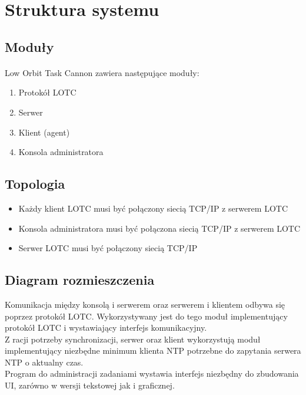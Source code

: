 \documentclass[10pt,a4paper]{article}
\begin{document}
	\section{Struktura systemu}
	
	    \subsection{Moduły}	
	        \paragraph{}
		    Low Orbit Task Cannon zawiera następujące moduły:
		
			\begin{enumerate}
		        \item Protokół LOTC
		        \item Serwer
		        \item Klient (agent)
		        \item Konsola administratora
		    \end{enumerate}
		    
	    \subsection{Topologia}
	    
		    \begin{itemize}
		        \item Każdy klient LOTC musi być połączony siecią TCP/IP z serwerem LOTC
		        \item Konsola administratora musi być połączona siecią TCP/IP z serwerem LOTC 
		        \item Serwer LOTC musi być połączony siecią TCP/IP
		    \end{itemize}
		    
		    \begin{figure}[H]
				\def\svgwidth{\columnwidth}
				
			\end{figure}
			
        \pagebreak			
			
	    \subsection{Diagram rozmieszczenia}
		    Komunikacja między konsolą i serwerem oraz serwerem i klientem odbywa się poprzez protokół LOTC. Wykorzystywany jest do tego moduł implementujący protokół LOTC i wystawiający interfejs komunikacyjny. \\
		    Z racji potrzeby synchronizacji, serwer oraz klient wykorzystują moduł implementujący niezbędne minimum klienta NTP potrzebne do zapytania serwera NTP o aktualny czas. \\
		    Program do administracji zadaniami wystawia interfejs niezbędny do zbudowania UI, zarówno w wersji tekstowej jak i graficznej. \\
\end{document}
